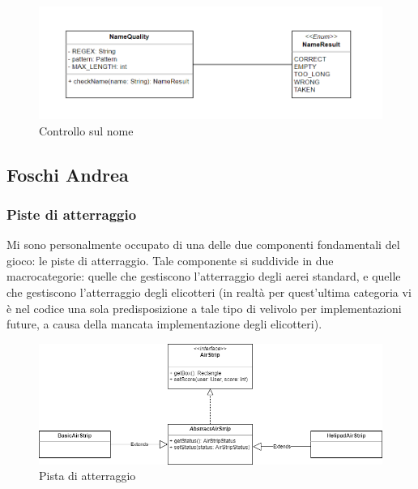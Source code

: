 \documentclass[a4paper,12pt]{report}
\begin{document}
\begin{figure}[H]
    \begin{center}
        \centering
        \includegraphics[width=\textwidth]{img/Design/Severi/Name.png}
    \end{center}
    \caption{Controllo sul nome}
    \label{img:name}
\end{figure}

\subsection{Foschi Andrea}
\subsubsection{Piste di atterraggio}
Mi sono personalmente occupato di una delle due componenti fondamentali del gioco: le piste di atterraggio. Tale componente si suddivide in due macrocategorie: quelle che gestiscono l’atterraggio degli aerei standard, e quelle che gestiscono l’atterraggio degli elicotteri (in realtà per quest’ultima categoria vi è nel codice una sola predisposizione a tale tipo di velivolo per implementazioni future, a causa della mancata implementazione degli elicotteri).
\begin{figure}[H]
    \begin{center}
        \centering
        \includegraphics[width=\textwidth]{img/Design/Foschi/Airstrip.png}
    \end{center}
    \caption{Pista di atterraggio}
    \label{img:airstrip}
\end{figure}
\end{document}
